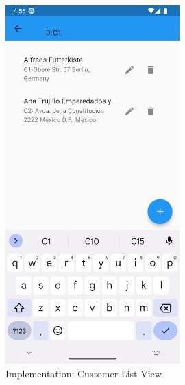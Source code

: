 \documentclass[../thesis.tex]{subfiles}
\begin{document}
\begin{figure}[H]
    \centering
    \includegraphics[width=0.60\textwidth]{images/CustomerScreen_ListSearch.png}
    \caption{Implementation: Customer List View}
    \label{fig:CustomerScreen_ListSearch}
\end{figure}
\end{document}
